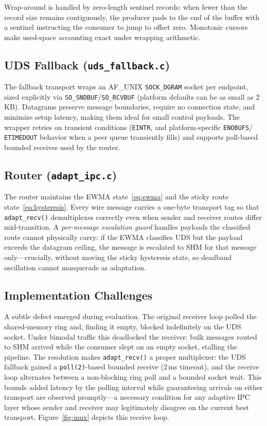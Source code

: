 \documentclass[conference]{IEEEtran}
\begin{document}
Wrap-around is handled by zero-length sentinel records: when fewer than the
record size remains contiguously, the producer pads to the end of the buffer
with a sentinel instructing the consumer to jump to offset zero. Monotonic
cursors make used-space accounting exact under wrapping arithmetic.

\subsection{UDS Fallback (\texttt{uds\_fallback.c})}
The fallback transport wraps an AF\_UNIX \texttt{SOCK\_DGRAM} socket per
endpoint, sized explicitly via \texttt{SO\_SNDBUF}/\texttt{SO\_RCVBUF}
(platform defaults can be as small as 2\,KB). Datagrams preserve message
boundaries, require no connection state, and minimize setup latency, making
them ideal for small control payloads. The wrapper retries on transient
conditions (\texttt{EINTR}, and platform-specific \texttt{ENOBUFS}/%
\texttt{ETIMEDOUT} behavior when a peer queue transiently fills) and supports
poll-based bounded receives used by the router.


\subsection{Router (\texttt{adapt\_ipc.c})}
The router maintains the EWMA state~\eqref{eq:ewma} and the sticky route
state~\eqref{eq:hysteresis}. Every wire message carries a one-byte transport
tag so that \texttt{adapt\_recv()} demultiplexes correctly even when sender
and receiver routes differ mid-transition. A \emph{per-message escalation
guard} handles payloads the classified route cannot physically carry: if the
EWMA classifies UDS but the payload exceeds the datagram ceiling, the message
is escalated to SHM for that message only---crucially, without moving the
sticky hysteresis state, so deadband oscillation cannot masquerade as
adaptation.

\subsection{Implementation Challenges}
A subtle defect emerged during evaluation. The original receiver loop polled
the shared-memory ring and, finding it empty, blocked indefinitely on the UDS
socket. Under bimodal traffic this deadlocked the receiver: bulk messages
routed to SHM arrived while the consumer slept on an empty socket, stalling
the pipeline. The resolution makes \texttt{adapt\_recv()} a proper
multiplexer: the UDS fallback gained a \texttt{poll(2)}-based bounded receive
(2\,ms timeout), and the receive loop alternates between a non-blocking ring
poll and a bounded socket wait. This bounds added latency by the polling
interval while guaranteeing arrivals on either transport are observed
promptly---a necessary condition for any adaptive IPC layer whose sender and
receiver may legitimately disagree on the current best transport.
Figure~\ref{fig:mux} depicts this receive loop.
\end{document}
